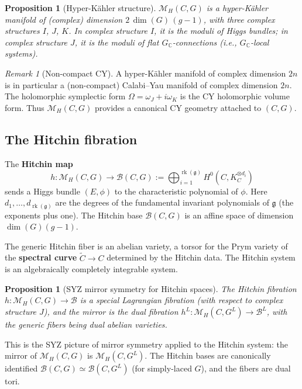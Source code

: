 \documentclass[11pt]{article}
\newtheorem{proposition}[theorem]{Proposition}
\theoremstyle{definition}
\theoremstyle{remark}
\newtheorem{remark}[theorem]{Remark}
\DeclareMathOperator{\rk}{rk}
\newcommand{\g}{\mathfrak{g}}
\begin{document}
\begin{proposition}[Hyper-K\"ahler structure]
$\mathcal{M}_H(C,G)$ is a hyper-K\"ahler manifold of (complex) dimension
$2\,\dim(G)\,(g-1)$, with three complex structures $I$, $J$, $K$.
In complex structure $I$, it is the moduli of Higgs bundles; in complex
structure $J$, it is the moduli of flat $G_\mathbb{C}$-connections (i.e.,
$G_\mathbb{C}$-local systems).
\end{proposition}

\begin{remark}[Non-compact CY]
A hyper-K\"ahler manifold of complex dimension $2n$ is in particular a
(non-compact) Calabi--Yau manifold of complex dimension $2n$. The holomorphic
symplectic form $\Omega = \omega_J + i\omega_K$ is the CY holomorphic volume
form. Thus $\mathcal{M}_H(C,G)$ provides a canonical CY geometry attached to
$(C, G)$.
\end{remark}

\subsection{The Hitchin fibration}

The \textbf{Hitchin map}
\[
 h \colon \mathcal{M}_H(C,G) \longrightarrow \mathcal{B}(C,G)
 := \bigoplus_{i=1}^{\rk(\g)} H^0(C, K_C^{\otimes d_i})
\]
sends a Higgs bundle $(E, \phi)$ to the characteristic polynomial of $\phi$.
Here $d_1, \ldots, d_{\rk(\g)}$ are the degrees of the fundamental invariant
polynomials of $\g$ (the exponents plus one). The Hitchin base
$\mathcal{B}(C,G)$ is an affine space of dimension $\dim(G)(g-1)$.

The generic Hitchin fiber is an abelian variety, a torsor for the Prym
variety of the \textbf{spectral curve} $\widetilde{C} \to C$ determined by
the Hitchin data. The Hitchin system is an algebraically completely integrable
system.

\begin{proposition}[SYZ mirror symmetry for Hitchin spaces]
\label{prop:syz-hitchin}
The Hitchin fibration $h \colon \mathcal{M}_H(C,G) \to \mathcal{B}$ is a
special Lagrangian fibration (with respect to complex structure $J$), and the
mirror is the dual fibration $h^L \colon \mathcal{M}_H(C,G^L) \to
\mathcal{B}^L$, with the generic fibers being dual abelian varieties.
\end{proposition}

This is the SYZ picture of mirror symmetry applied to the Hitchin system:
the mirror of $\mathcal{M}_H(C,G)$ is $\mathcal{M}_H(C,G^L)$.
The Hitchin bases are canonically identified $\mathcal{B}(C,G) \simeq
\mathcal{B}(C,G^L)$ (for simply-laced $G$), and the fibers are dual tori.
\end{document}
